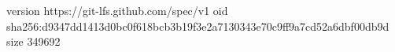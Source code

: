 version https://git-lfs.github.com/spec/v1
oid sha256:d9347dd1413d0bc0f618bcb3b19f3e2a7130343e70c9ff9a7cd52a6dbf00db9d
size 349692
